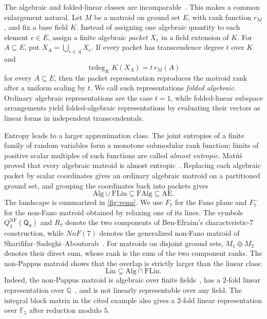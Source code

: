 \documentclass[11pt]{article}
\theoremstyle{definition}
\newcommand{\trdeg}{\operatorname{trdeg}}
\newcommand{\FAlg}{\mathrm{FAlg}}
\newcommand{\FLin}{\mathrm{FLin}}
\newcommand{\Alg}{\mathrm{Alg}}
\newcommand{\Lin}{\mathrm{Lin}}
\newcommand{\AlmostEnt}{\mathrm{AE}}
\begin{document}
The algebraic and folded-linear classes are incomparable~\cite{BenEfraim2016,Matus1999}.  This makes a common enlargement natural.  Let $M$ be a matroid on ground set $E$, with rank function $r_M$, and fix a base field $K$.  Instead of assigning one algebraic quantity to each element $e\in E$, assign a finite algebraic \emph{packet} $X_e$ in a field extension of $K$.  For $A\subseteq E$, put $X_A=\bigcup_{e\in A}X_e$.  If every packet has transcendence degree $t$ over $K$ and
\[
\trdeg_K K(X_A)=t\,r_M(A)
\]
for every $A\subseteq E$, then the packet representation reproduces the matroid rank after a uniform scaling by $t$.  We call such representations \emph{folded algebraic}.  Ordinary algebraic representations are the case $t=1$, while folded-linear subspace arrangements yield folded-algebraic representations by evaluating their vectors as linear forms in independent transcendentals.

Entropy leads to a larger approximation class.  The joint entropies of a finite family of random variables form a monotone submodular rank function; limits of positive scalar multiples of such functions are called \emph{almost entropic}.  Mat\'u\v{s} proved that every algebraic matroid is almost entropic~\cite{Matus2024}.  Replacing each algebraic packet by scalar coordinates gives an ordinary algebraic matroid on a partitioned ground set, and grouping the coordinates back into packets gives
\[
\Alg\cup\FLin\subseteq\FAlg\subseteq\AlmostEnt.
\]
The landscape is summarized in \cref{fig:venn}.  We use $F_7$ for the Fano plane and $F_7^-$ for the non-Fano matroid obtained by relaxing one of its lines.  The symbols $Q^{\mathrm{NF}}_3(\mathsf Q_8)$ and $R_7$ denote the two components of Ben-Efraim's characteristic-$7$ construction, while $NnF(7)$ denotes the generalized non-Fano matroid of Sharififar--Sadeghi--Aboutorab~\cite{BenEfraim2016,SharififarEtAl2024}.  For matroids on disjoint ground sets, $M_1\oplus M_2$ denotes their direct sum, whose rank is the sum of the two component ranks.  The non-Pappus matroid shows that the overlap is strictly larger than the linear class:
\[
\Lin\subsetneq \Alg\cap\FLin.
\]
Indeed, the non-Pappus matroid is algebraic over finite fields~\cite{LindstromNonPappus1986}, has a $2$-fold linear representation over $\mathbb Q$~\cite[Example~4.2]{PendavinghVanZwam2013}, and is not linearly representable over any field.  The integral block matrix in the cited example also gives a $2$-fold linear representation over $\mathbb F_5$ after reduction modulo $5$.
\end{document}
